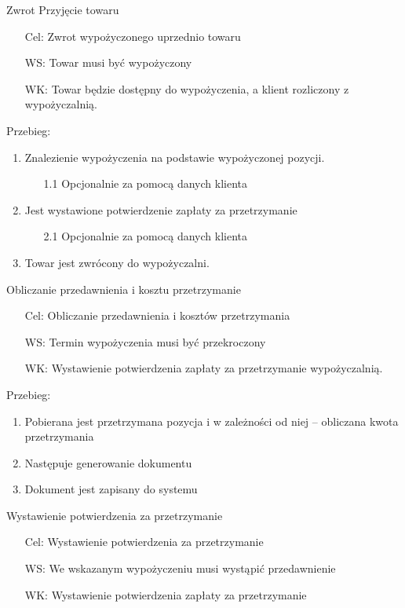 \documentclass{article}
\begin{document}
\LARGE	Zwrot \newline
\Large	Przyjęcie towaru\newline
\normalsize
\begin{enumerate}
\item[Cel:] Zwrot wypożyczonego uprzednio towaru
	\item[WS:] Towar musi być wypożyczony
	\item[WK:]  Towar będzie dostępny do wypożyczenia, a klient rozliczony z wypożyczalnią.
\end{enumerate}
	Przebieg:
	\begin{enumerate}
		\item Znalezienie wypożyczenia na podstawie wypożyczonej pozycji.
		\begin{enumerate}
			\item [1.1] Opcjonalnie za pomocą danych klienta 
		\end{enumerate}
		\item Jest wystawione potwierdzenie zapłaty za przetrzymanie
			\begin{enumerate}
			\item [2.1] Opcjonalnie za pomocą danych klienta 
		\end{enumerate}
		\item Towar jest zwrócony do wypożyczalni.
	\end{enumerate}
\Large	Obliczanie przedawnienia i kosztu przetrzymanie\newline
\normalsize
\begin{enumerate}
	\item[Cel:] Obliczanie przedawnienia i kosztów przetrzymania
	\item[WS:] Termin wypożyczenia musi być przekroczony
	\item[WK:]  Wystawienie potwierdzenia zapłaty za przetrzymanie wypożyczalnią.
\end{enumerate}
	Przebieg:\newline
	\begin{enumerate}
		\item Pobierana jest przetrzymana pozycja i w zależności od niej – obliczana kwota przetrzymania
		\item Następuje generowanie dokumentu
		\item Dokument jest zapisany do systemu
	\end{enumerate}
	\Large	Wystawienie potwierdzenia za przetrzymanie \newline
	\normalsize
	\begin{enumerate}
		\item[Cel:] Wystawienie potwierdzenia za przetrzymanie
		\item[WS:] We wskazanym wypożyczeniu musi wystąpić przedawnienie
		\item[WK:] Wystawienie potwierdzenia zapłaty za przetrzymanie
	\end{enumerate}
\end{document}
